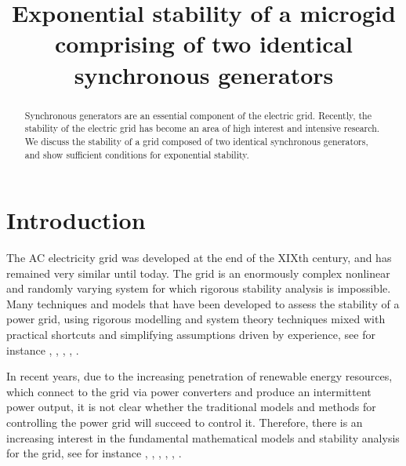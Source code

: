 \documentclass[conference]{IEEEtran}
\begin{document}
\title{ Exponential stability  of a microgid comprising of two identical synchronous generators}
\author{  \and 
    }

\maketitle

\begin{abstract}
Synchronous generators are an essential component of the electric
grid. Recently, the stability of the electric grid has become an area
of high interest and intensive research. We discuss the stability of a
grid composed of two identical synchronous generators, and show sufficient conditions for exponential stability.
\end{abstract}

\section{Introduction}

The AC electricity grid was developed at the end of the XIXth century,
and has remained very similar until today. The grid is an enormously
complex nonlinear and randomly varying system for which rigorous
stability analysis is impossible. Many techniques and models that have
been developed to assess the stability of a power grid, using rigorous
modelling and system theory techniques mixed with practical shortcuts
and simplifying assumptions driven by experience, see for instance
\cite{Kundur}, \cite{GrSt2014}, \cite{SauerPai1998}, \cite{GOBS:03},
\cite{DoBull:12}.

In recent years, due to the increasing penetration of renewable energy
resources, which connect to the grid via power converters and produce
an intermittent power output, it is not clear whether the traditional
models and methods for controlling the power grid will succeed to
control it. Therefore, there is an increasing interest in the
fundamental mathematical models and stability analysis for the grid,
see for instance \cite{DoBull:12}, \cite{PoDoBu:13}, \cite{CaTa:14},
\cite{NaWe:14}, \cite{NaWe:15}, \cite{DePersiSchaft:16}.
\end{document}
